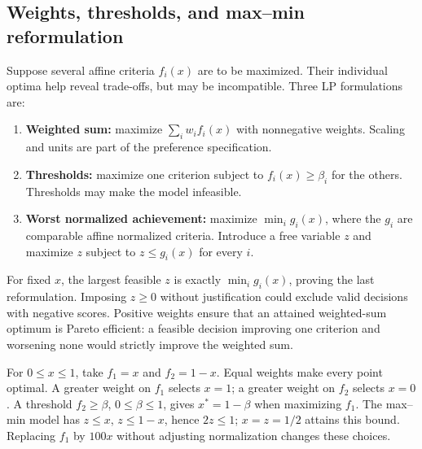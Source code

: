 \documentclass[11pt,a4paper]{article}
\begin{document}
\subsection{Weights, thresholds, and max--min reformulation}
Suppose several affine criteria $f_i(x)$ are to be maximized. Their individual
optima help reveal trade-offs, but may be incompatible. Three LP formulations are:
\begin{enumerate}[leftmargin=1.8em]
  \item \textbf{Weighted sum:} maximize $\sum_i w_i f_i(x)$ with nonnegative
        weights. Scaling and units are part of the preference specification.
  \item \textbf{Thresholds:} maximize one criterion subject to $f_i(x)\geq\beta_i$
        for the others. Thresholds may make the model infeasible.
  \item \textbf{Worst normalized achievement:} maximize $\min_i g_i(x)$, where
        the $g_i$ are comparable affine normalized criteria. Introduce a free
        variable $z$ and maximize $z$ subject to $z\leq g_i(x)$ for every $i$.
\end{enumerate}
For fixed $x$, the largest feasible $z$ is exactly $\min_i g_i(x)$, proving
the last reformulation. Imposing $z\geq0$ without justification could exclude
valid decisions with negative scores. Positive weights ensure that an attained
weighted-sum optimum is Pareto efficient: a feasible decision improving one
criterion and worsening none would strictly improve the weighted sum.

For $0\leq x\leq1$, take $f_1=x$ and $f_2=1-x$. Equal weights make every
point optimal. A greater weight on $f_1$ selects $x=1$; a greater weight on
$f_2$ selects $x=0$. A threshold $f_2\geq\beta$, $0\leq\beta\leq1$, gives
$x^*=1-\beta$ when maximizing $f_1$. The max--min model has
$z\leq x$, $z\leq1-x$, hence $2z\leq1$; $x=z=1/2$ attains this bound.
Replacing $f_1$ by $100x$ without adjusting normalization changes these choices.
\end{document}
